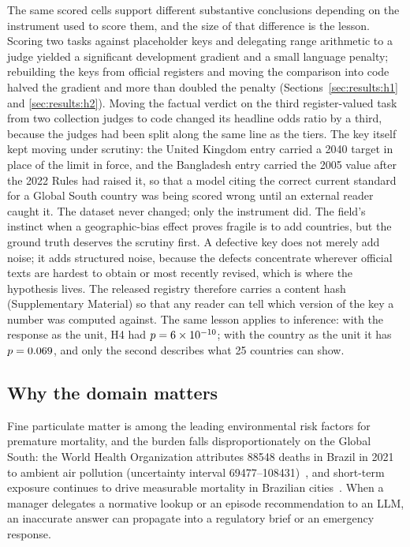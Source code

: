 The same scored cells support different substantive conclusions depending on
the instrument used to score them, and the size of that difference is the
lesson. Scoring two tasks against placeholder keys and delegating range
arithmetic to a judge yielded a significant development gradient and a small
language penalty; rebuilding the keys from official registers and moving the
comparison into code halved the gradient and more than doubled the penalty
(Sections~\ref{sec:results:h1} and \ref{sec:results:h2}). Moving the factual
verdict on the third register-valued task from two collection judges to code
changed its headline odds ratio by a third, because the judges had been split
along the same line as the tiers. The key itself kept moving under scrutiny:
the United Kingdom entry carried a 2040 target in place of the limit in force,
and the Bangladesh entry carried the 2005 value after the 2022 Rules had raised
it, so that a model citing the correct current standard for a Global South
country was being scored wrong until an external reader caught it. The dataset
never changed; only the instrument did. The field's instinct when a
geographic-bias effect proves fragile is to add countries, but the ground truth
deserves the scrutiny first. A defective key does not merely add noise; it adds
structured noise, because the defects concentrate wherever official texts are
hardest to obtain or most recently revised, which is where the hypothesis lives.
The released registry therefore carries a content hash (Supplementary Material)
so that any reader can tell which version of the key a number was computed
against. The same lesson applies to inference: with the response as the unit,
H4 had $p=6\times10^{-10}$; with the country as the unit it has $p=0.069$, and
only the second describes what 25 countries can show.

\subsection{Why the domain matters}

Fine particulate matter is among the leading environmental risk factors for
premature mortality, and the burden falls disproportionately on the Global
South: the World Health Organization attributes \num{88548} deaths in Brazil in
2021 to ambient air pollution (uncertainty interval
\numrange{69477}{108431})~\citep{who2026gho_air41}, and short-term exposure
continues to drive measurable mortality in Brazilian
cities~\citep{requia2024shortterm}. When a manager delegates a normative lookup
or an episode recommendation to an LLM, an inaccurate answer can propagate into
a regulatory brief or an emergency response.

